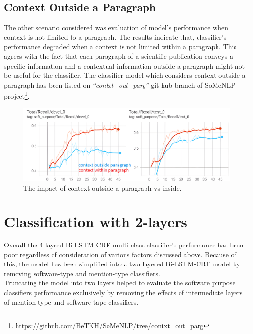 \subsection{Context Outside a Paragraph}
\label{sec:chapter06:contxtOutside}


The other scenario considered was evaluation of model’s performance when context is not limited to a paragraph. The results indicate that, classifier’s performance degraded when a context is not limited within a paragraph. This agrees with the fact that each paragraph of a scientific publication conveys a specific information and a contextual information outside a paragraph might not be useful for the classifier. The classifier model which considers context outside a paragraph has been listed on \emph{“contxt\_out\_parg”} git-hub branch of SoMeNLP project\footnote{\url{https://github.com/BeTKH/SoMeNLP/tree/contxt_out_parg}}. 

\begin{figure}[htbp]
	\centering
	\includegraphics[width=.90\textwidth]{4.graphics/figures/ch_6/4.context_outside_paragraph_vs_inside/HD/1}
	\caption{The impact of context outside a paragraph vs inside.}
	\label{fig:chapter06:with}
\end{figure}

\section{Classification with 2-layers}
\label{sec:chapter06:2lc}

Overall the 4-layred \ac{Bi-LSTM-CRF} multi-class classifier’s performance has been poor regardless of consideration of various factors discussed above. Because of this, the model has been simplified into a two layered Bi-LSTM-CRF model by removing software-type and mention-type classifiers. \\

Truncating the model into two layers helped to evaluate the software purpose classifiers performance exclusively by removing the effects of intermediate layers of mention-type and software-tape classifiers. \\

